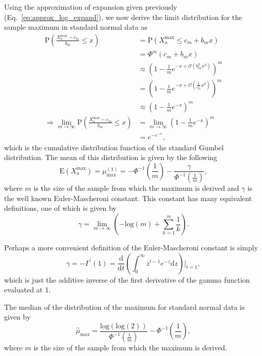 \documentclass[aoas]{imsart}
\begin{document}
Using the approximation of expansion given previously (Eq.~\ref{eq:approx_log_expand}), we now derive the limit distribution for the sample maximum in standard normal data as
%
\begin{equation}\label{eq:prob_normal_max}
\begin{aligned}
\text{P}\left(\frac{X^\text{max}_a - c_m}{b_m} \leq x\right) &= \text{P}(X^\text{max}_a \leq c_m + b_m x) \\
&= \Phi^m(c_m + b_m x) \\
&\approx \left(1 - \frac{1}{m}e^{-x + \mathcal{O}(b^2_m x^2)}\right)^m \\
&= \left(1 - \frac{1}{m}e^{-x + \mathcal{O}\left(\frac{1}{c^2_m} x^2\right)}\right)^m \\
&\approx \left(1 - \frac{1}{m}e^{-x}\right)^m \\
\Rightarrow \lim_{m \to \infty} \text{P}\left(\frac{X^\text{max}_a - c_m}{b_m} \leq x\right) &= \lim_{m \to \infty} \left(1 - \frac{1}{m}e^{-x}\right)^m \\
&= e^{-e^{-x}},
\end{aligned}
\end{equation}
%
which is the cumulative distribution function of the standard Gumbel distribution. The mean of this distribution is given by the following
%
\begin{equation}\label{eq:mu_max_normal}
\text{E}(X^\text{max}_a) = \mu^{(1)}_\text{max} = -\Phi^{-1} \left(\frac{1}{m}\right) - \frac{\gamma}{\Phi^{-1}\left(\frac{1}{m}\right)},
\end{equation}
%
where $m$ is the size of the sample from which the maximum is derived and $\gamma$ is the well known Euler-Mascheroni constant. This constant has many equivalent definitions, one of which is given by
%
\[
\gamma = \lim_{m \to \infty} \left(-\text{log}(m) + \sum^{m}_{k=1}\frac{1}{k}\right).
\]

Perhaps a more convenient definition of the Euler-Mascheroni constant is simply
%
\[
\gamma = - \Gamma^\prime (1) = \frac{\text{d}}{\text{d}t} \left(\int^{\infty}_{0} z^{t-1} e^{-z} \text{d}z\right) \biggr|_{t=1},
\]
%
which is just the additive inverse of the first derivative of the gamma function evaluated at 1.

The median of the distribution of the maximum for standard normal data is given by
%
\begin{equation}\label{eq:med_max_normal}
\overset{\sim}{\mu}_\text{max} = \frac{\text{log}(\text{log}(2))}{\Phi^{-1}\left(\frac{1}{m}\right)} - \Phi^{-1}\left(\frac{1}{m}\right),
\end{equation}
%
where $m$ is the size of the sample from which the maximum is derived.
\end{document}
